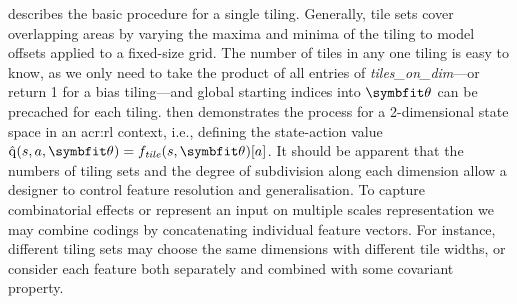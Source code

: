  describes the basic procedure for a single tiling.
Generally, tile sets cover overlapping areas by varying the maxima and minima of the tiling to model offsets applied to a fixed-size grid.
The number of tiles in any one tiling is easy to know, as we only need to take the product of all entries of \emph{tiles\_on\_dim}---or return 1 for a bias tiling---and global starting indices into $\wvec{}$ can be precached for each tiling.
 then demonstrates the process for a 2-dimensional state space in an \gls{acr:rl} context, i.e., defining the state-action value $\acval{s}{a}{\wvec{}} = f_\mathit{tile}(s, \wvec{})[a]$.
It should be apparent that the numbers of tiling sets and the degree of subdivision along each dimension allow a designer to control feature resolution and generalisation.
To capture combinatorial effects or represent an input on multiple scales representation we may combine codings by concatenating individual feature vectors.
For instance, different tiling sets may choose the same dimensions with different tile widths, or consider each feature both separately and combined with some covariant property.

